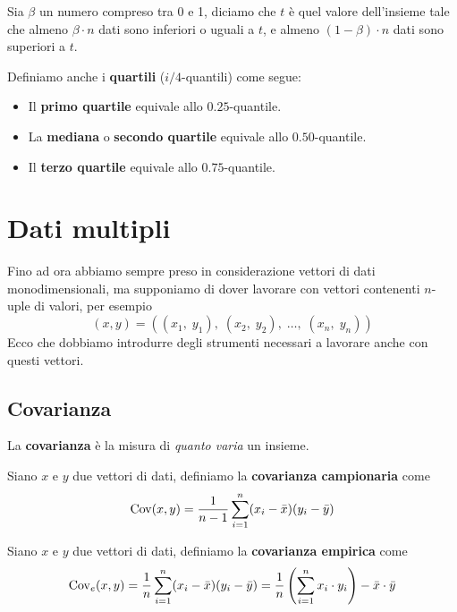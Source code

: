 \begin{definition}
	Sia $\beta$ un numero compreso tra 0 e 1, diciamo che $t$ è quel valore dell'insieme tale che
	almeno $\beta \cdot n$ dati sono inferiori o uguali a $t$, e almeno $(1-\beta) \cdot n$ dati
	sono superiori a $t$.
\end{definition}

\begin{definition}
	Definiamo anche i \textbf{quartili} ($i/4$-quantili) come segue:
	\begin{itemize}
		\item Il \textbf{primo quartile} equivale allo $0.25$-quantile.
		\item La \textbf{mediana} o \textbf{secondo quartile} equivale allo $0.50$-quantile.
		\item Il \textbf{terzo quartile} equivale allo $0.75$-quantile.
	\end{itemize}
\end{definition}

\section{Dati multipli}
Fino ad ora abbiamo sempre preso in considerazione vettori di dati monodimensionali, ma supponiamo
di dover lavorare con vettori contenenti $n$-uple di valori, per esempio
\[ (x, y) = ((x_1, \; y_1), \; (x_2, \; y_2), \; \dots, \; (x_n, \; y_n)) \]
Ecco che dobbiamo introdurre degli strumenti necessari a lavorare anche con questi vettori.

\subsection{Covarianza}
La \textbf{covarianza} è la misura di \emph{quanto varia} un insieme.

\begin{definition}
	Siano $x$  e $y$ due vettori di dati, definiamo la \textbf{covarianza campionaria} come
	\[ \operatorname{Cov}(x, y) = \frac{1}{n - 1} \sum_{i=1}^n (x_i - \bar{x}) (y_i - \bar{y}) \]
\end{definition}

\begin{definition}
	Siano $x$  e $y$ due vettori di dati, definiamo la \textbf{covarianza empirica} come
	\[
		\operatorname{Cov}_e(x, y) = \frac{1}{n} \sum_{i=1}^n (x_i - \bar{x}) (y_i - \bar{y}) =
		\frac{1}{n} \left( \sum_{i=1}^n x_i \cdot y_i \right) - \bar{x} \cdot \bar{y}
	\]
\end{definition}

